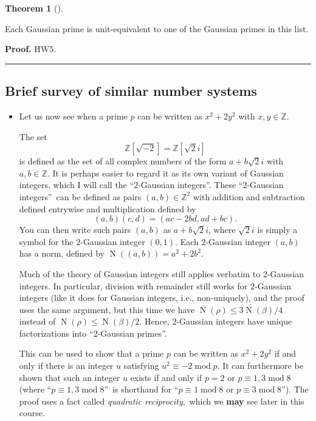 \documentclass[numbers=enddot,12pt,final,onecolumn,notitlepage]{scrartcl}%
\numberwithin{exer}{subsection}
\theoremstyle{definition}
\newtheorem{theo}{Theorem}[subsection]
\newenvironment{theorem}[1][]
{\begin{theo}[#1]\begin{leftbar}}
{\end{leftbar}\end{theo}}
\newenvironment{proof}[1][Proof]{\noindent\textbf{#1.} }{\ \rule{0.5em}{0.5em}}
\begin{document}
\begin{theorem}
Each Gaussian prime is unit-equivalent to one of the Gaussian primes in this list.
\end{theorem}

\begin{proof}
HW5.
\end{proof}

\subsection{Brief survey of similar number systems}

\begin{itemize}
\item Let us now see when a prime $p$ can be written as $x^{2}+2y^{2}$ with
$x,y\in\mathbb{Z}$.

The set
\[
\mathbb{Z}\left[  \sqrt{-2}\right]  =\mathbb{Z}\left[  \sqrt{2}i\right]
\]
is defined as the set of all complex numbers of the form $a+b\sqrt{2}i$ with
$a,b\in\mathbb{Z}$. It is perhaps easier to regard it as its own variant of
Gaussian integers, which I will call the \textquotedblleft$2$-Gaussian
integers\textquotedblright. These \textquotedblleft$2$-Gaussian
integers\textquotedblright\ can be defined as pairs $\left(  a,b\right)
\in\mathbb{Z}^{2}$ with addition and subtraction defined entrywise and
multiplication defined by%
\[
\left(  a,b\right)  \left(  c,d\right)  =\left(  ac-2bd,ad+bc\right)  .
\]
You can then write such pairs $\left(  a,b\right)  $ as $a+b\sqrt{2}i$, where
$\sqrt{2}i$ is simply a symbol for the $2$-Gaussian integer $\left(
0,1\right)  $. Each $2$-Gaussian integer $\left(  a,b\right)  $ has a norm,
defined by $\operatorname*{N}\left(  \left(  a,b\right)  \right)
=a^{2}+2b^{2}$.

Much of the theory of Gaussian integers still applies verbatim to $2$-Gaussian
integers. In particular, division with remainder still works for $2$-Gaussian
integers (like it does for Gaussian integers, i.e., non-uniquely), and the
proof uses the same argument, but this time we have $\operatorname*{N}\left(
\rho\right)  \leq3\operatorname*{N}\left(  \beta\right)  /4$ instead of
$\operatorname*{N}\left(  \rho\right)  \leq\operatorname*{N}\left(
\beta\right)  /2$. Hence, $2$-Gaussian integers have unique factorizations
into \textquotedblleft$2$-Gaussian primes\textquotedblright.

This can be used to show that a prime $p$ can be written as $x^{2}+2y^{2}$ if
and only if there is an integer $u$ satisfying $u^{2}\equiv
-2\operatorname{mod}p$. It can furthermore be shown that such an integer $u$
exists if and only if $p=2$ or $p\equiv1,3\operatorname{mod}8$ (where
\textquotedblleft$p\equiv1,3\operatorname{mod}8$\textquotedblright\ is
shorthand for \textquotedblleft$p\equiv1\operatorname{mod}8$ or $p\equiv
3\operatorname{mod}8$\textquotedblright). The proof uses a fact called
\textit{quadratic reciprocity},\ which we \textbf{may} see later in this course.


\end{itemize}
\end{document}
